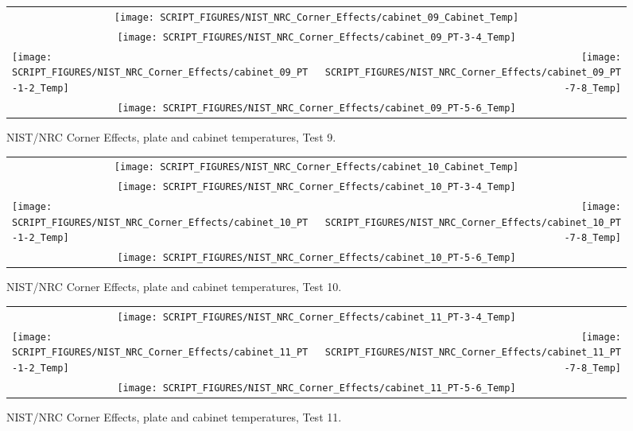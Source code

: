 \begin{figure}[p]
\begin{tabular*}{\textwidth}{l@{\extracolsep{\fill}}r}
\multicolumn{2}{c}{\texttt{[image: SCRIPT\_FIGURES/NIST\_NRC\_Corner\_Effects/cabinet\_09\_Cabinet\_Temp]}} \\
\multicolumn{2}{c}{\texttt{[image: SCRIPT\_FIGURES/NIST\_NRC\_Corner\_Effects/cabinet\_09\_PT-3-4\_Temp]}} \\
\texttt{[image: SCRIPT\_FIGURES/NIST\_NRC\_Corner\_Effects/cabinet\_09\_PT-1-2\_Temp]} &
\texttt{[image: SCRIPT\_FIGURES/NIST\_NRC\_Corner\_Effects/cabinet\_09\_PT-7-8\_Temp]} \\
\multicolumn{2}{c}{\texttt{[image: SCRIPT\_FIGURES/NIST\_NRC\_Corner\_Effects/cabinet\_09\_PT-5-6\_Temp]}}
\end{tabular*}
\caption[NIST/NRC Corner Effects, plate and cabinet temperatures, Test 9]{NIST/NRC Corner Effects, plate and cabinet temperatures, Test 9.}
\label{NIST_NRC_Cabinet_PT_Test_9}
\end{figure}

\begin{figure}[p]
\begin{tabular*}{\textwidth}{l@{\extracolsep{\fill}}r}
\multicolumn{2}{c}{\texttt{[image: SCRIPT\_FIGURES/NIST\_NRC\_Corner\_Effects/cabinet\_10\_Cabinet\_Temp]}} \\
\multicolumn{2}{c}{\texttt{[image: SCRIPT\_FIGURES/NIST\_NRC\_Corner\_Effects/cabinet\_10\_PT-3-4\_Temp]}} \\
\texttt{[image: SCRIPT\_FIGURES/NIST\_NRC\_Corner\_Effects/cabinet\_10\_PT-1-2\_Temp]} &
\texttt{[image: SCRIPT\_FIGURES/NIST\_NRC\_Corner\_Effects/cabinet\_10\_PT-7-8\_Temp]} \\
\multicolumn{2}{c}{\texttt{[image: SCRIPT\_FIGURES/NIST\_NRC\_Corner\_Effects/cabinet\_10\_PT-5-6\_Temp]}}
\end{tabular*}
\caption[NIST/NRC Corner Effects, plate and cabinet temperatures, Test 10]{NIST/NRC Corner Effects, plate and cabinet temperatures, Test 10.}
\label{NIST_NRC_Cabinet_PT_Test_10}
\end{figure}

\begin{figure}[p]
\begin{tabular*}{\textwidth}{l@{\extracolsep{\fill}}r}
\multicolumn{2}{c}{\texttt{[image: SCRIPT\_FIGURES/NIST\_NRC\_Corner\_Effects/cabinet\_11\_PT-3-4\_Temp]}} \\
\texttt{[image: SCRIPT\_FIGURES/NIST\_NRC\_Corner\_Effects/cabinet\_11\_PT-1-2\_Temp]} &
\texttt{[image: SCRIPT\_FIGURES/NIST\_NRC\_Corner\_Effects/cabinet\_11\_PT-7-8\_Temp]} \\
\multicolumn{2}{c}{\texttt{[image: SCRIPT\_FIGURES/NIST\_NRC\_Corner\_Effects/cabinet\_11\_PT-5-6\_Temp]}}
\end{tabular*}
\caption[NIST/NRC Corner Effects, plate and cabinet temperatures, Test 11]{NIST/NRC Corner Effects, plate and cabinet temperatures, Test 11.}
\label{NIST_NRC_Cabinet_PT_Test_11}
\end{figure}

